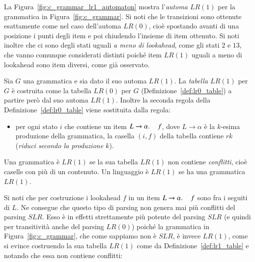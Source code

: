 La Figura~\ref{fig:c_grammar_lr1_automaton} mostra
l'\emph{automa $\mathit{LR}(1)$} per la grammatica
in Figura~\ref{fig:c_grammar}. Si noti che le transizioni sono ottenute
esattamente come nel caso dell'automa $\mathit{LR}(0)$,
cio\`e spostando avanti di una
posizione i punti degli item e poi chiudendo l'insieme di item \cosi
ottenuto. Si noti inoltre che ci sono degli
stati uguali \emph{a meno di lookahead}, come gli stati $2$ e $13$,
che vanno comunque considerati distinti poich\'e item $\mathit{LR}(1)$ uguali
a meno di lookahead sono item diversi, come gi\`a osservato.
%
\begin{definition}\label{def:lr1_table}
Sia $G$ una grammatica e sia dato il suo automa $\mathit{LR}(1)$.
La \emph{tabella $\mathit{LR}(1)$} per $G$ \`e costruita come
la tabella $\mathit{LR}(0)$ per $G$ (Definizione~\ref{def:lr0_table})
a partire per\`o dal suo automa $\mathit{LR}(1)$. Inoltre la seconda
regola della Definizione~\ref{def:lr0_table} viene sostituita dalla regola:
\begin{itemize}
\item per ogni stato $i$ che contiene un item $L\to\alpha.\,\quad f$, dove
      $L\to\alpha$ \`e la $k$-esima produzione della grammatica, la casella
      $(i,f)$ della tabella contiene $rk$
      (\emph{riduci secondo la produzione $k$}).
\end{itemize}
\end{definition}
%
\begin{definition}\label{def:lr1_grammar}
Una grammatica \`e $\mathit{LR}(1)$ se la sua tabella $\mathit{LR}(1)$ non
contiene \emph{conflitti},
cio\`e caselle con pi\`u di un contenuto. Un linguaggio \`e $\mathit{LR}(1)$ se
ha una grammatica $\mathit{LR}(1)$.
\end{definition}
%
\noindent
Si noti che per costruzione i lookahead $f$ in un item
$L\to\alpha.\,\quad f$ sono fra i seguiti di $L$. Ne consegue che
questo tipo di parsing non genera mai pi\`u conflitti del parsing
$\mathit{SLR}$. Esso \`e in effetti strettamente pi\`u potente del
parsing $\mathit{SLR}$ (e quindi per transitivit\`a anche del parsing
$\mathit{LR}(0)$) poich\'e la grammatica in Figura~\ref{fig:c_grammar}, che
come sappiamo non \`e $\mathit{SLR}$,
\`e invece $\mathit{LR}(1)$, come si evince
costruendo la sua tabella $\mathit{LR}(1)$ come da
Definizione~\ref{def:lr1_table} e notando che essa non contiene conflitti:
%
